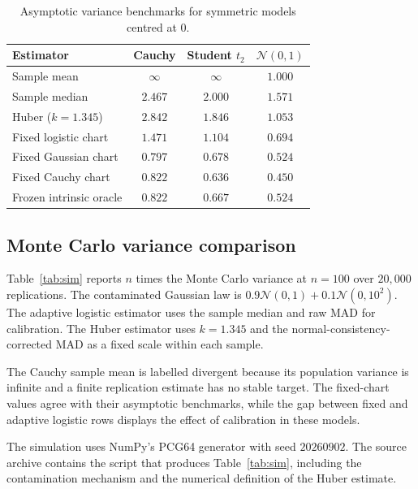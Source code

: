 \documentclass[11pt,a4paper]{article}
\theoremstyle{definition}
\begin{document}
\begin{table}[H]
\centering
\caption{Asymptotic variance benchmarks for symmetric models centred at $0$.}
\label{tab:avar}
\begin{tabular}{lccc}
\toprule
Estimator & Cauchy & Student $t_2$ & $\mathcal N(0,1)$\\
\midrule
Sample mean & $\infty$ & $\infty$ & $1.000$\\
Sample median & $2.467$ & $2.000$ & $1.571$\\
Huber ($k=1.345$) & $2.842$ & $1.846$ & $1.053$\\
Fixed logistic chart & $1.471$ & $1.104$ & $0.694$\\
Fixed Gaussian chart & $0.797$ & $0.678$ & $0.524$\\
Fixed Cauchy chart & $0.822$ & $0.636$ & $0.450$\\
\midrule
Frozen intrinsic oracle & $0.822$ & $0.667$ & $0.524$\\
\bottomrule
\end{tabular}
\end{table}

\subsection{Monte Carlo variance comparison}

Table~\ref{tab:sim} reports $n$ times the Monte Carlo variance at $n=100$ over $20{,}000$ replications. The contaminated Gaussian law is $0.9\mathcal N(0,1)+0.1\mathcal N(0,10^2)$. The adaptive logistic estimator uses the sample median and raw MAD for calibration. The Huber estimator uses $k=1.345$ and the normal-consistency-corrected MAD as a fixed scale within each sample.

The Cauchy sample mean is labelled divergent because its population variance is infinite and a finite replication estimate has no stable target. The fixed-chart values agree with their asymptotic benchmarks, while the gap between fixed and adaptive logistic rows displays the effect of calibration in these models.

The simulation uses NumPy's PCG64 generator with seed $20260902$. The source archive contains the script that produces Table~\ref{tab:sim}, including the contamination mechanism and the numerical definition of the Huber estimate.
\end{document}
